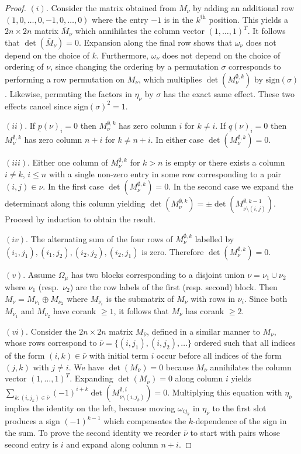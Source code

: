 \documentclass[10pt]{amsart}
\newcommand{\pp}{{\underline{p}}}
\newcommand{\qq}{{\underline{q}}}
\theoremstyle{plain}
\newcommand{\0}{\color{blue}{\mathsf{0}}}
\begin{document}
\begin{proof}
$(i).$ Consider the matrix obtained from  $M_\nu$ by adding an additional  row $(1,0,\dots,0,-1,0,\ldots,0)$ where the entry $-1$ is in the $k^{\mathrm{th}}$ position. 
This yields a $2n\times 2n$ matrix $\bar M_\nu$ which annihilates the column vector
$(1,\ldots, 1)^T$.
It follows that $\det(\bar M_{\nu})=0$. Expansion along the
final row shows that $\omega_\nu$ does not depend on the choice of $k$. Furthermore, $\omega_{\nu}$ does not depend on the choice of ordering of $\nu$, since changing the ordering by a  permutation $\sigma$ corresponds to performing a row permutation on  $M_{\nu}$, which multiplies  $\det(M_{\nu}^{\emptyset,k})$ by $\mathrm{sign}(\sigma)$. Likewise, permuting the factors  in $\eta_{\nu}$  by $\sigma$ has the exact same effect. These two effects cancel since $\mathrm{sign}(\sigma)^2=1.$

$(ii).$   If $\pp(\nu)_i=0$ then $M_{\nu}^{\emptyset,k}$ has zero column $i$ for $k\neq i$.
If $\qq(\nu)_i=0$ then $M_{\nu}^{\emptyset,k}$ has zero column $n+i$  for $k\neq n+i$. In either case
$\det(M_\nu^{\emptyset,k})=0$.

$(iii).$  
Either one column of $M_{\nu}^{\emptyset,k}$ for $k>n$ is empty or there exists a column $i\neq k$, $i\leq n$ with a single non-zero entry in some row corresponding to a pair $(i,j)\in\nu$. In the first case $\det(M_{\nu}^{\emptyset,k})=0$. In the second case we expand the determinant
along this column yielding $\det(M_{\nu}^{\emptyset,k})=\pm\det(M_{\nu\setminus(i,j)}^{\emptyset,k-1})$. Proceed by induction to obtain  the result.

$(iv).$  
The alternating sum of the four rows  of $M_{\nu}^{\emptyset,k}$ labelled by
$(i_1,j_1), (i_1,j_2), (i_2,j_2), (i_2,j_1)$ is zero. Therefore  $\det(M_{\nu}^{\emptyset,k})=0$.

$(v).$ Assume $\Omega_\mu$ has two blocks  corresponding to a disjoint union $\nu = \nu_1  \cup \nu_2$ where $\nu_1$ (resp.\ $\nu_2$) are the row labels of the first (resp. second) block.  Then $M_{\nu}  = M_{\nu_1} \oplus M_{\nu_2}$ where $M_{\nu_i}$ is the submatrix of $M_{\nu}$ 
with rows in $\nu_i$. Since  both $M_{\nu_1}$ and $M_{\nu_2}$
 have corank $\geq 1$, it follows that  $M_{\nu}$ has corank $\geq 2$. 

$(vi).$ Consider the $2n\times 2n$ matrix $M_{\bar \nu}$, defined in a similar manner to $M_{\nu}$, whose rows correspond to
$\bar\nu=\{(i,j_1),(i,j_2),\ldots\}$ ordered such that  all indices of the form $(i,k) \in \bar \nu$ with initial term $i$ occur before all indices of the form $(j,k)$ with $j\neq i.$
We have $\det(M_{\bar\nu})=0$ because $M_{\bar\nu}$ annihilates
the column vector $(1,\ldots, 1)^T$. 
Expanding $\det(M_{\bar\nu})=0$ along column $i$ yields
$\sum_{k:(i,j_k)\in\bar\nu}(-1)^{i+k}\det(M_{\bar\nu\setminus (i,j_k)}^{\emptyset,i})=0$.
Multiplying this equation with $\eta_{\bar\nu}$ implies the  identity on the left,  because moving $\omega_{ij_k}$ in $\eta_{\bar\nu}$ to the first slot produces a sign $(-1)^{k-1}$ which compensates the $k$-dependence of the sign in the sum.
To prove the second identity we reorder $\bar\nu$ to start with pairs whose second entry is $i$ and expand along column $n+i$.


\end{proof}
\end{document}
